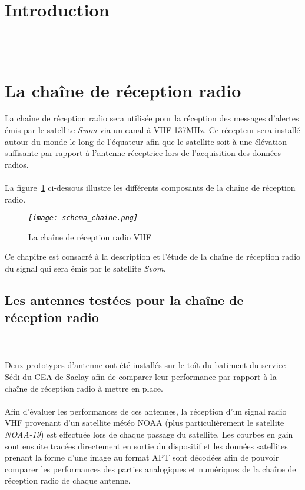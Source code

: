 \documentclass[12pt,fleqn]{book} %
\begin{document}

\pagestyle{empty} %

\tableofcontents %



\pagestyle{fancy} %
\setcounter{part}{-1}
\part{Introduction}
\setcounter{chapter}{0}
~\\\\
\part{La chaîne de réception radio}
\setcounter{chapter}{0}
La chaîne de réception radio sera utilisée pour la réception des messages d'alertes émis par le satellite \emph{Svom} via un canal à VHF 137MHz. Ce récepteur sera installé autour du monde le long de l'équateur afin que le satellite soit à une élévation suffisante par rapport à l'antenne réceptrice lors de l'acquisition des données radios.
~\\\\La figure~\underline{\color{blue}\ref{schema_chaine}} ci-dessous illustre les différents composants de la chaîne de réception radio.
\begin{figure}[H]
	\centering
	\itshape
	\texttt{[image: schema\_chaine.png]}
	\caption{\label{schema_chaine} \underline{La chaîne de réception radio VHF}}
\end{figure}
Ce chapitre est consacré à la description et l'étude de la chaîne de réception radio du signal qui sera émis par le satellite \emph{Svom}.

\chapter{Les antennes testées pour la chaîne de réception radio} 
~\\\\Deux prototypes d'antenne ont été installés sur le toît du batiment du service Sédi du CEA de Saclay afin de comparer leur performance par rapport à la chaîne de réception radio à mettre en place.
~\\\\Afin d'évaluer les performances de ces antennes, la réception d'un signal radio VHF provenant d'un satellite météo NOAA (plus particulièrement le satellite \emph{NOAA-19}) est effectuée lors de chaque passage du satellite. Les courbes en gain sont ensuite tracées directement en sortie du dispositif et les données satellites prenant la forme d'une image au format APT sont décodées afin de pouvoir comparer les performances des parties analogiques et numériques de la chaîne de réception radio de chaque antenne.
\end{document}
